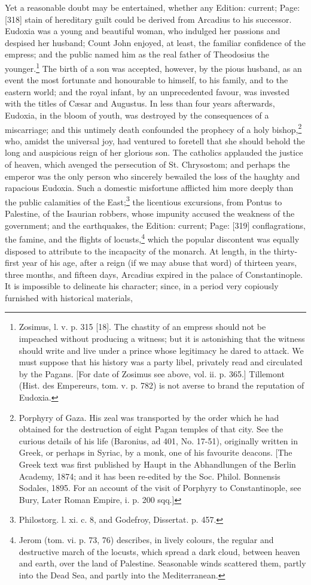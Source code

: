 Yet a reasonable doubt may be entertained, whether any Edition: current; Page: [318] stain of hereditary guilt could be derived from Arcadius to his successor. Eudoxia was a young and beautiful woman, who indulged her passions and despised her husband; Count John enjoyed, at least, the familiar confidence of the empress; and the public named him as the real father of Theodosius the younger.\footnote{Zosimus, l. v. p. 315 [18]. The chastity of an empress should not be impeached without producing a witness; but it is astonishing that the witness should write and live under a prince whose legitimacy he dared to attack. We must suppose that his history was a party libel, privately read and circulated by the Pagans. [For date of Zosimus see above, vol. ii. p. 365.] Tillemont (Hist. des Empereurs, tom. v. p. 782) is not averse to brand the reputation of Eudoxia.} The birth of a son was accepted, however, by the pious husband, as an event the most fortunate and honourable to himself, to his family, and to the eastern world; and the royal infant, by an unprecedented favour, was invested with the titles of Cæsar and Augustus. In less than four years afterwards, Eudoxia, in the bloom of youth, was destroyed by the consequences of a miscarriage; and this untimely death confounded the prophecy of a holy bishop,\footnote{Porphyry of Gaza. His zeal was transported by the order which he had obtained for the destruction of eight Pagan temples of that city. See the curious details of his life (Baronius, ad 401, No. 17-51), originally written in Greek, or perhaps in Syriac, by a monk, one of his favourite deacons. [The Greek text was first published by Haupt in the Abhandlungen of the Berlin Academy, 1874; and it has been re-edited by the Soc. Philol. Bonnensis Sodales, 1895. For an account of the visit of Porphyry to Constantinople, see Bury, Later Roman Empire, i. p. 200 sqq.]} who, amidst the universal joy, had ventured to foretell that she should behold the long and auspicious reign of her glorious son. The catholics applauded the justice of heaven, which avenged the persecution of St. Chrysostom; and perhaps the emperor was the only person who sincerely bewailed the loss of the haughty and rapacious Eudoxia. Such a domestic misfortune afflicted him more deeply than the public calamities of the East;\footnote{Philostorg. l. xi. c. 8, and Godefroy, Dissertat. p. 457.} the licentious excursions, from Pontus to Palestine, of the Isaurian robbers, whose impunity accused the weakness of the government; and the earthquakes, the Edition: current; Page: [319] conflagrations, the famine, and the flights of locusts,\footnote{Jerom (tom. vi. p. 73, 76) describes, in lively colours, the regular and destructive march of the locusts, which spread a dark cloud, between heaven and earth, over the land of Palestine. Seasonable winds scattered them, partly into the Dead Sea, and partly into the Mediterranean.} which the popular discontent was equally disposed to attribute to the incapacity of the monarch. At length, in the thirty-first year of his age, after a reign (if we may abuse that word) of thirteen years, three months, and fifteen days, Arcadius expired in the palace of Constantinople. It is impossible to delineate his character; since, in a period very copiously furnished with historical materials, 